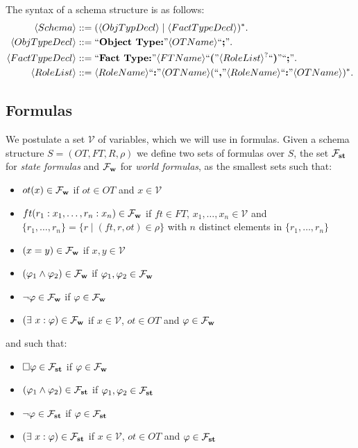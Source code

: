 \documentclass[11pt]{amsart}
\newcommand{\nt}[1]{\langle {#1} \rangle}
\newcommand{\tm}[1]{\textrm{``\textbf{#1}''}}
\newcommand{\stateform}{\mathcal{F}_{\textrm{\textbf{st}}}}
\newcommand{\worldform}{\mathcal{F}_{\textrm{\textbf{w}}}}
\newcommand{\always}{\square}
\begin{document}
The syntax of a schema structure is as follows:
{\small
\begin{align*}
\nt{Schema} &::= ( \nt{ObjTypDecl} \mid \nt{FactTypeDecl} )^* . \\
\nt{ObjTypeDecl} &::= \tm{Object Type:} \nt{OTName} \tm{;}. \\
\nt{FactTypeDecl} &::= \tm{Fact Type:} \nt{FTName} \tm{(} \nt{RoleList}^? \tm{)} \tm{;}. \\
\nt{RoleList} &::= \nt{RoleName} \tm{:} \nt{OTName} (\tm{,} \nt{RoleName} \tm{:} \nt{OTName} )^* .
\end{align*}  
}


  
\subsection{Formulas} 

We postulate a set $\mathcal{V}$ of variables, which we will use in formulas. Given a schema structure $S = (OT, FT, R, \rho)$ we define two sets of formulas over $S$, the set $\stateform$ for \emph{state formulas} and $\worldform$ for \emph{world formulas}, as the smallest sets such that:
\begin{itemize}
  \item $ot(x) \in \worldform$ if $ot \in OT$ and $x \in \mathcal{V}$
  \item $ft(r_1:x_1, \ldots, r_n:x_n) \in \worldform$ if $ft \in FT$, $x_1, \ldots, x_n \in \mathcal{V}$ and $\{ r_1, \ldots, r_n \} = \{ r \mid (ft, r, ot) \in \rho \}$ with $n$ distinct elements in $\{ r_1, \ldots, r_n \}$  
  \item $(x = y) \in \worldform$ if $x, y \in \mathcal{V}$ 
  \item $(\varphi_1 \wedge \varphi_2) \in \worldform$ if $\varphi_1, \varphi_2 \in \worldform$
  \item $\neg\varphi \in \worldform$ if $\varphi \in \worldform$
  \item $(\exists\  x : \varphi) \in \worldform$ if $x \in \mathcal{V}$, $ot \in OT$ and $\varphi \in \worldform$
\end{itemize}
and such that:
\begin{itemize}
  \item $\always\varphi \in \stateform$ if $\varphi \in \worldform$
  \item $(\varphi_1 \wedge \varphi_2) \in \stateform$ if $\varphi_1, \varphi_2 \in \stateform$
  \item $\neg\varphi \in \stateform$ if $\varphi \in \stateform$
  \item $(\exists\  x : \varphi) \in \stateform$ if $x \in \mathcal{V}$, $ot \in OT$ and $\varphi \in \stateform$
\end{itemize}
\end{document}
